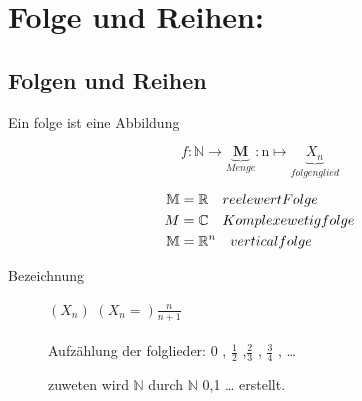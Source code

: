 
\chapter{Folge und Reihen:}
\section{Folgen und Reihen}
\begin{definition}
    Ein folge ist eine Abbildung

    \[ f: \mathbb{N} \rightarrow \underbrace{\mathbf{M}}_{Menge} : \mathrm{n} \mapsto \underbrace{X_n}_{folgenglied} \]

\end{definition}
\begin{remark}

    \begin{align}	\mathbb{M} &= \mathbb{R} \quad reelewert Folge  \notag \\
    M&= \mathbb{C} \quad	 Komplexewetig folge  \notag \\
    \mathbb{M}&= \mathbb{R}^n \quad vertical folge \notag
    \end{align}




\end{remark}
\begin{description}

    \item[Bezeichnung]

    \quad $(X_n)$ \space {} \space $ \left( X_n =  \right) \frac{n}{n+1} $
    \\ \\ Aufzählung der folglieder: 0 , $\frac{1}{2}$ ,$\frac{2}{3}$ , $\frac{3}{4}$ , \dots
    \begin{remark}
        zuweten wird $\mathbb{N}$ durch $\mathbb{N}$ {0,1 \dots} erstellt.


    \end{remark}
\end{description}
